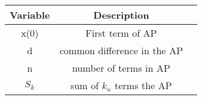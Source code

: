 \begin{tabular}{|c|c|c|}
    \hline
    \textbf{Variable} & \textbf{Description}\\
    \hline
    x(0) & First term of AP\\
    \hline
    d & common difference in the AP\\
    \hline
    n & number of terms in AP\\
    \hline
    $S_k$ & sum of $k_n$ terms the AP\\
    \hline
\end{tabular}
